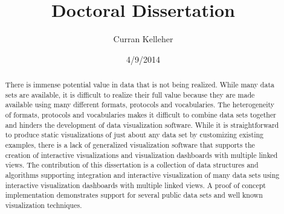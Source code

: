 \documentclass[12pt]{article}
\title{Doctoral Dissertation}
\author{Curran Kelleher}
\date{4/9/2014}
\begin{document}
\maketitle 

\begin{onehalfspacing}
\begin{abstract}
There is immense potential value in data that is not being realized. While many data sets are available, it is difficult to realize their full value because they are made available using many different formats, protocols and vocabularies. The heterogeneity of formats, protocols and vocabularies makes it difficult to combine data sets together and hinders the development of data visualization software. While it is straightforward to produce static visualizations of just about any data set by customizing existing examples, there is a lack of generalized visualization software that supports the creation of interactive visualizations and visualization dashboards with multiple linked views. The contribution of this dissertation is a collection of data structures and algorithms supporting integration and interactive visualization of many data sets using interactive visualization dashboards with multiple linked views. A proof of concept implementation demonstrates support for several public data sets and well known visualization techniques.
\end{abstract}
\end{onehalfspacing}

\pagebreak

\tableofcontents

\pagebreak
\end{document}

